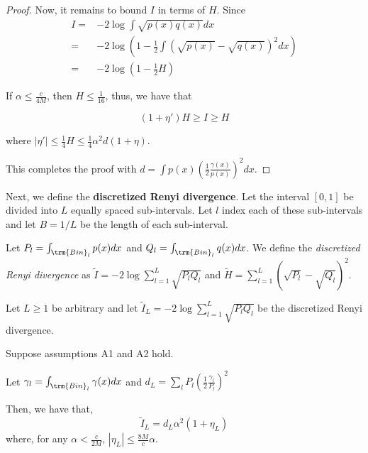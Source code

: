 \documentclass{article}
\begin{document}
\begin{proof}
Now, it remains to bound $I$ in terms of $H$. Since
\begin{align*}
I =& -2 \log \int \sqrt{p(x)q(x)} dx \\
 =& -2 \log \left( 1 - \frac{1}{2} \int (\sqrt{p(x)} - \sqrt{q(x)})^2 dx \right) \\
 =& -2 \log (1 - \frac{1}{2} H) 
\end{align*}

If $\alpha \leq \frac{c}{4M}$, then $H \leq \frac{1}{16}$, thus, we have that

\[
(1 + \eta') H \geq I \geq H
\]

where $|\eta'| \leq \frac{1}{4} H \leq \frac{1}{4} \alpha^2 d (1 + \eta)$.  

This completes the proof with $d = \int p(x) \left( \frac{1}{2} \frac{\gamma(x)}{p(x)} \right)^2 dx$. 

\end{proof}


Next, we define the \textbf{discretized Renyi divergence}. Let the interval $[0,1]$ be divided into $L$ equally spaced sub-intervals. Let $l$ index each of these sub-intervals and let $B = 1/L$ be the length of each sub-interval.

Let $P_l = \int_{\trm{Bin}_l} p(x) dx$ and $Q_l = \int_{\trm{Bin}_l} q(x)dx$. We define the \emph{discretized Renyi divergence} as $\tilde{I} = -2 \log \sum_{l=1}^L \sqrt{P_l Q_l} $ and $\tilde{H} = \sum_{l=1}^L (\sqrt{P_l} - \sqrt{Q_l})^2$. 


\begin{proposition}
\label{prop:discrete_renyi_order}
Let $L \geq 1$ be arbitrary and let $\tilde{I}_L = -2 \log \sum_{l=1}^L \sqrt{P_l Q_l}$ be the discretized Renyi divergence. 

Suppose assumptions A1 and A2 hold. 

Let $\gamma_l = \int_{\trm{Bin}_l} \gamma(x) dx$ and $d_L = \sum_l P_l \left( \frac{1}{2} \frac{\gamma_l}{P_l} \right)^2 $

Then, we have that,
\[
 \tilde{I}_L = d_L \alpha^2 ( 1 + \eta_L )
\]
where, for any $\alpha < \frac{c}{2M}$, $|\eta_L| \leq \frac{8M}{c} \alpha$.

\end{proposition}
\end{document}
